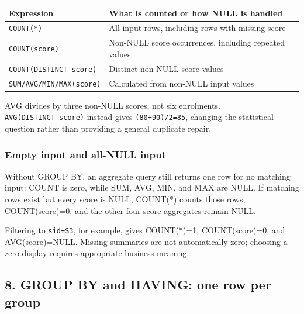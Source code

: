 \begin{longtable}[]{@{}
  >{\raggedright\arraybackslash}p{}
  >{\raggedright\arraybackslash}p{}@{}}
\toprule\noalign{}
\begin{minipage}[b]{\linewidth}\raggedright
Expression
\end{minipage} & \begin{minipage}[b]{\linewidth}\raggedright
What is counted or how NULL is handled
\end{minipage} \\
\midrule\noalign{}
\endhead
\bottomrule\noalign{}
\endlastfoot
\texttt{COUNT(\allowbreak{}*)\allowbreak{}} & All input rows, including rows with missing score \\
\texttt{COUNT(\allowbreak{}score)\allowbreak{}} & Non-NULL score occurrences, including repeated values \\
\texttt{COUNT(\allowbreak{}DISTINCT\ score)\allowbreak{}} & Distinct non-NULL score values \\
\texttt{SUM/\allowbreak{}AVG/\allowbreak{}MIN/\allowbreak{}MAX(\allowbreak{}score)\allowbreak{}} & Calculated from non-NULL input values \\
\end{longtable}

AVG divides by three non-NULL scores, not six enrolments. \texttt{AVG(\allowbreak{}DISTINCT\ score)\allowbreak{}} instead gives \texttt{(\allowbreak{}80+90)\allowbreak{}/\allowbreak{}2=85}, changing the statistical question rather than providing a general duplicate repair.

\subsubsection{Empty input and all-NULL input}\label{06_sql_queries_en-empty-input-and-all-null-input}

Without GROUP BY, an aggregate query still returns one row for no matching input: COUNT is zero, while SUM, AVG, MIN, and MAX are NULL. If matching rows exist but every score is NULL, COUNT(*) counts those rows, COUNT(score)=0, and the other four score aggregates remain NULL.

Filtering to \texttt{sid=\textquotesingle{}S3\textquotesingle{}}, for example, gives COUNT(*)=1, COUNT(score)=0, and AVG(score)=NULL. Missing summaries are not automatically zero; choosing a zero display requires appropriate business meaning.

\subsection{8. GROUP BY and HAVING: one row per group}\label{06_sql_queries_en-group-by-and-having-one-row-per-group}

